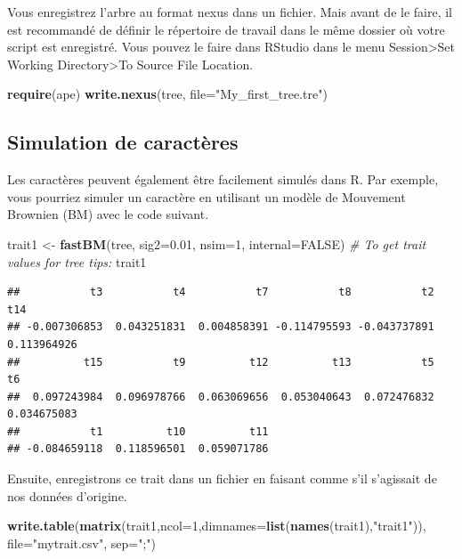 \documentclass[
]{book}
\newenvironment{Shaded}{\begin{snugshade}}{\end{snugshade}}
\newcommand{\AttributeTok}[1]{\textcolor[rgb]{0.13,0.29,0.53}{#1}}
\newcommand{\CommentTok}[1]{\textcolor[rgb]{0.56,0.35,0.01}{\textit{#1}}}
\newcommand{\ConstantTok}[1]{\textcolor[rgb]{0.56,0.35,0.01}{#1}}
\newcommand{\DecValTok}[1]{\textcolor[rgb]{0.00,0.00,0.81}{#1}}
\newcommand{\FloatTok}[1]{\textcolor[rgb]{0.00,0.00,0.81}{#1}}
\newcommand{\FunctionTok}[1]{\textcolor[rgb]{0.13,0.29,0.53}{\textbf{#1}}}
\newcommand{\NormalTok}[1]{#1}
\newcommand{\OtherTok}[1]{\textcolor[rgb]{0.56,0.35,0.01}{#1}}
\newcommand{\StringTok}[1]{\textcolor[rgb]{0.31,0.60,0.02}{#1}}
\begin{document}
Vous enregistrez l'arbre au format nexus dans un fichier. Mais avant de le faire, il est recommandé de définir le répertoire de travail dans le même dossier où votre script est enregistré. Vous pouvez le faire dans RStudio dans le menu Session\textgreater Set Working Directory\textgreater To Source File Location.

\begin{Shaded}
\begin{Highlighting}[]
\FunctionTok{require}\NormalTok{(ape)}
\FunctionTok{write.nexus}\NormalTok{(tree, }\AttributeTok{file=}\StringTok{"My\_first\_tree.tre"}\NormalTok{)}
\end{Highlighting}
\end{Shaded}

\subsection{Simulation de caractères}\label{simulation-de-caractuxe8res}

Les caractères peuvent également être facilement simulés dans R. Par exemple, vous pourriez simuler un caractère en utilisant un modèle de Mouvement Brownien (BM) avec le code suivant.

\begin{Shaded}
\begin{Highlighting}[]
\NormalTok{trait1 }\OtherTok{\textless{}{-}} \FunctionTok{fastBM}\NormalTok{(tree, }\AttributeTok{sig2=}\FloatTok{0.01}\NormalTok{, }\AttributeTok{nsim=}\DecValTok{1}\NormalTok{, }\AttributeTok{internal=}\ConstantTok{FALSE}\NormalTok{)}
\CommentTok{\# To get trait values for tree tips:}
\NormalTok{trait1}
\end{Highlighting}
\end{Shaded}

\begin{verbatim}
##           t3           t4           t7           t8           t2          t14 
## -0.007306853  0.043251831  0.004858391 -0.114795593 -0.043737891  0.113964926 
##          t15           t9          t12          t13           t5           t6 
##  0.097243984  0.096978766  0.063069656  0.053040643  0.072476832  0.034675083 
##           t1          t10          t11 
## -0.084659118  0.118596501  0.059071786
\end{verbatim}

Ensuite, enregistrons ce trait dans un fichier en faisant comme s'il s'agissait de nos données d'origine.

\begin{Shaded}
\begin{Highlighting}[]
\FunctionTok{write.table}\NormalTok{(}\FunctionTok{matrix}\NormalTok{(trait1,}\AttributeTok{ncol=}\DecValTok{1}\NormalTok{,}\AttributeTok{dimnames=}\FunctionTok{list}\NormalTok{(}\FunctionTok{names}\NormalTok{(trait1),}\StringTok{"trait1"}\NormalTok{)), }\AttributeTok{file=}\StringTok{"mytrait.csv"}\NormalTok{, }\AttributeTok{sep=}\StringTok{";"}\NormalTok{)}
\end{Highlighting}
\end{Shaded}
\end{document}
